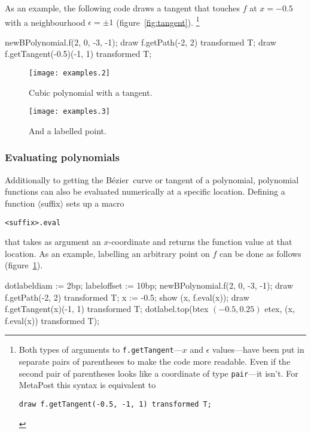 \documentclass{article}
\newcommand*{\cmd}[1]{\texttt{#1}}
\newcommand*{\B}{B\'ezier}
\begin{document}
As an example, the following code draws a tangent that touches $f$ at $x=-0.5$ with a neighbourhood $\epsilon = \pm 1$ (figure~\ref{fig:tangent}).%
\footnote{Both types of arguments to \cmd{f.getTangent}---$x$ and $\epsilon$ values---have been put in separate pairs of parentheses to make the code more readable.  Even if the second pair of parentheses looks like a coordinate of type \cmd{pair}---it isn't.  For MetaPost this syntax is equivalent to
  \begin{center}
    \cmd{draw f.getTangent(-0.5, -1, 1) transformed T;}
  \end{center}
}
\begin{listing}
  newBPolynomial.f(2, 0, -3, -1);
  draw f.getPath(-2, 2) transformed T;
  draw f.getTangent(-0.5)(-1, 1) transformed T;
\end{listing}

\begin{figure}
  \begin{minipage}[t]{.45\linewidth}
    \centering
    \texttt{[image: examples.2]}
    \caption{Cubic polynomial with a tangent.}
    \label{fig:tangent}
  \end{minipage}\hfill%
  \begin{minipage}[t]{.45\linewidth}
    \centering
    \texttt{[image: examples.3]}
    \caption{And a labelled point.}
    \label{fig:labelled}
  \end{minipage}
\end{figure}

\subsubsection{Evaluating polynomials}\label{sec:eval}
Additionally to getting the \B\ curve or tangent of a polynomial, polynomial functions can also be evaluated numerically at a specific location.  Defining a function $\langle$suffix$\rangle$ sets up a macro
\begin{center}
  \cmd{<suffix>.eval}
\end{center}
that takes as argument an $x$-coordinate and returns the function value at that location.  As an example, labelling an arbitrary point on $f$ can be done as follows (figure~\ref{fig:labelled}).
\begin{listing}
  dotlabeldiam := 2bp;
  labeloffset := 10bp;
  newBPolynomial.f(2, 0, -3, -1);
  draw f.getPath(-2, 2) transformed T;
  x := -0.5;
  show (x, f.eval(x));
  draw f.getTangent(x)(-1, 1) transformed T;
  dotlabel.top(btex $(-0.5, 0.25)$ etex, (x, f.eval(x)) transformed T);
\end{listing}
\end{document}
